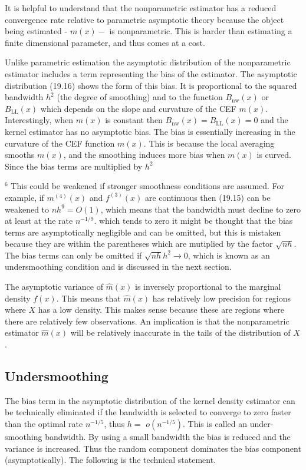 \documentclass[10pt]{article}
\begin{document}
It is helpful to understand that the nonparametric estimator has a reduced convergence rate relative to parametric asymptotic theory because the object being estimated - $m(x)-$ is nonparametric. This is harder than estimating a finite dimensional parameter, and thus comes at a cost.

Unlike parametric estimation the asymptotic distribution of the nonparametric estimator includes a term representing the bias of the estimator. The asymptotic distribution (19.16) shows the form of this bias. It is proportional to the squared bandwidth $h^{2}$ (the degree of smoothing) and to the function $B_{\mathrm{nw}}(x)$ or $B_{\mathrm{LL}}(x)$ which depends on the slope and curvature of the CEF $m(x)$. Interestingly, when $m(x)$ is constant then $B_{\mathrm{nw}}(x)=B_{\mathrm{LL}}(x)=0$ and the kernel estimator has no asymptotic bias. The bias is essentially increasing in the curvature of the CEF function $m(x)$. This is because the local averaging smooths $m(x)$, and the smoothing induces more bias when $m(x)$ is curved. Since the bias terms are multiplied by $h^{2}$

${ }^{6}$ This could be weakened if stronger smoothness conditions are assumed. For example, if $m^{(4)}(x)$ and $f^{(3)}(x)$ are continuous then (19.15) can be weakened to $n h^{9}=O(1)$, which means that the bandwidth must decline to zero at least at the rate $n^{-1 / 9}$. which tends to zero it might be thought that the bias terms are asymptotically negligible and can be omitted, but this is mistaken because they are within the parentheses which are mutiplied by the factor $\sqrt{n h}$. The bias terms can only be omitted if $\sqrt{n h} h^{2} \rightarrow 0$, which is known as an undersmoothing condition and is discussed in the next section.

The asymptotic variance of $\widehat{m}(x)$ is inversely proportional to the marginal density $f(x)$. This means that $\widehat{m}(x)$ has relatively low precision for regions where $X$ has a low density. This makes sense because these are regions where there are relatively few observations. An implication is that the nonparametric estimator $\widehat{m}(x)$ will be relatively inaccurate in the tails of the distribution of $X$.

\subsection{Undersmoothing}
The bias term in the asymptotic distribution of the kernel density estimator can be technically eliminated if the bandwidth is selected to converge to zero faster than the optimal rate $n^{-1 / 5}$, thus $h=$ $o\left(n^{-1 / 5}\right)$. This is called an under-smoothing bandwidth. By using a small bandwidth the bias is reduced and the variance is increased. Thus the random component dominates the bias component (asymptotically). The following is the technical statement.
\end{document}
